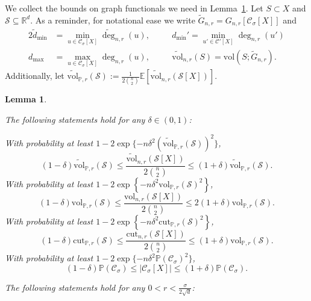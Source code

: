 \documentclass[11pt,twoside]{article}
\newtheorem{lemma}{Lemma}
\newcommand{\set}[1]{\left\{#1\right\}}
\newcommand{\vol}{\mathrm{vol}}
\newcommand{\cut}{\mathrm{cut}}
\newcommand{\abs}[1]{\left \lvert #1 \right \rvert}
\newcommand{\Reals}{\mathbb{R}}
\newcommand{\Rd}{\Reals^d}
\newcommand{\1}{\mathbf{1}}
\newcommand{\Xbf}{X}             %
\newcommand{\Pbb}{\mathbb{P}}
\newcommand{\Sset}{\mathcal{S}}
\newcommand{\Cset}{\mathcal{C}}
\newcommand{\Csig}{\Cset_{\sigma}}
\begin{document}
We collect the bounds on graph functionals we need in Lemma~\ref{lem:ball_bounds_in_probability}. Let $S \subset X$ and $\mathcal{S} \subseteq \Rd$. As a reminder, for notational ease we write $\widetilde{G}_{n,r} = G_{n,r}[\Csig[\Xbf]]$ and
\begin{alignat*}{2}
\widetilde{d}_{\min} & = \min_{u \in \Csig[\Xbf]} \widetilde{\deg}_{n,r}(u), \quad && d_{\min}' = \min_{u' \in \Cset'[\Xbf]} {\deg}_{n,r}(u') \\
d_{\max} & = \max_{u \in \Csig[\Xbf]} \deg_{n,r}(u), \quad && \widetilde{\vol}_{n,r}(S) = \vol(S; \widetilde{G}_{n,r}). 
\end{alignat*}
Additionally, let $\widetilde{\vol}_{\Pbb,r}(\mathcal{S}) := \frac{1}{2{n \choose 2}}\mathbb{E}[\widetilde{\vol}_{n,r}(\mathcal{S}[\Xbf])]$.
\begin{lemma}
	\label{lem:ball_bounds_in_probability} \label{lem:graph_functional_concentration}
	\item[]
	The following statements hold for any $\delta \in (0,1)$:
	
	\noindent With probability at least $1 - 2\exp\{-n\delta^2(\widetilde{\vol}_{\Pbb,r}(\mathcal{S}))^2\}$,
	\begin{equation}
	\label{eqn:volwt_bound}
	(1 - \delta) \widetilde{\vol}_{\Pbb,r}(\mathcal{S}) \leq \frac{\widetilde{\vol}_{n,r}(\mathcal{S}[\Xbf])}{2{n \choose 2}} \leq (1 + \delta) \widetilde{\vol}_{\Pbb,r}(\mathcal{S}).
	\end{equation}
	With probability at least $1 - 2\exp\set{-n \delta^2 \vol_{\Pbb,r}(\Sset)^2}$,
	\begin{equation}
	\label{eqn:vol_bound}
	(1 - \delta)\vol_{\Pbb,r}(\Sset) \leq \frac{\vol_{n,r}(\Sset[\Xbf])}{2{n \choose 2}}\leq 2(1 + \delta)\vol_{\Pbb,r}(\Sset).
	\end{equation}
	With probability at least $1 - 2\exp\set{-n \delta^2 \cut_{\Pbb,r}(\Sset)^2}$,
	\begin{equation}
	\label{eqn:cut_bound}
	(1 - \delta)\cut_{\Pbb,r}(\Sset) \leq \frac{\cut_{n,r}(\Sset[\Xbf])}{2{n \choose 2}}\leq (1 + \delta)\vol_{\Pbb,r}(\Sset).
	\end{equation}
	With probability at least $1 - 2\exp\{-n\delta^2\Pbb(\Csig)^2\}$, 
	\begin{equation}
	\label{eqn:cardinality}
	(1 - \delta) \Pbb(\Csig) \leq \abs{\Csig[\Xbf]} \leq (1 + \delta) \Pbb(\Csig).
	\end{equation}
	
	\noindent The following statements hold for any $0 < r < \frac{\sigma}{2\sqrt{d}}$:
	

\end{lemma}
\end{document}
